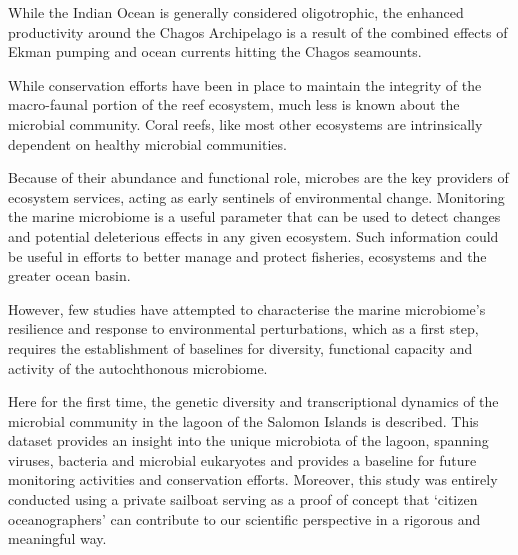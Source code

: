 While the Indian Ocean is generally considered oligotrophic, the enhanced productivity around the Chagos Archipelago \cite{sheppard1999ecology} is a result of the combined effects of Ekman pumping \cite{sheppard2012reefs, resplandy2009seasonal} and ocean currents hitting the Chagos seamounts. \cite{sheppard1999ecology, mendonca_is_2012}

While conservation efforts have been in place to maintain the integrity of the macro-faunal portion of the reef ecosystem, much less is known about the microbial community. Coral reefs, like most other ecosystems are intrinsically dependent on healthy microbial communities. \cite{dinsdale_microbial_2008, rosenberg_role_2007}

Because of their abundance and functional role, microbes are the key providers of ecosystem services, acting as early sentinels of environmental change. Monitoring the marine microbiome is a useful parameter that can be used to detect changes and potential deleterious effects in any given ecosystem. Such information could be useful in efforts to better manage and protect fisheries, ecosystems and the greater ocean basin.

However, few studies have attempted to characterise the marine microbiome's resilience and response to environmental perturbations, which as a first step, requires the establishment of baselines for diversity, functional capacity and activity of the autochthonous microbiome.

Here for the first time, the genetic diversity and transcriptional dynamics of the microbial community in the lagoon of the Salomon Islands is described. This dataset provides an insight into the unique microbiota of the lagoon, spanning viruses, bacteria and microbial eukaryotes and provides a baseline for future monitoring activities and conservation efforts. Moreover, this study was entirely conducted using a private sailboat serving as a proof of concept that `citizen oceanographers' can contribute to our scientific perspective in a rigorous and meaningful way. \cite{lauro_common_2014}